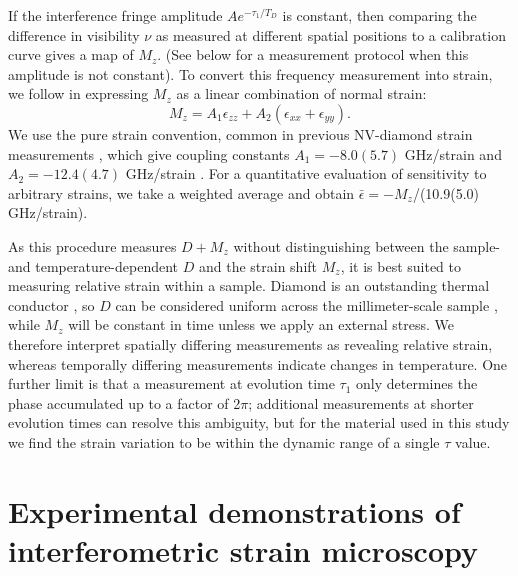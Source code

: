 \documentclass[reprint,superscriptaddress,hyphens,amsmath,amssymb,aps,prx,float]{revtex4-2}
\begin{document}
If the interference fringe amplitude $A e^{-\tau_1/T_D}$ is constant, then comparing the difference in visibility $\nu$ as measured at different spatial positions to a calibration curve gives a map of $M_z$.  (See below for a measurement protocol when this amplitude is not constant).  To convert this frequency measurement into strain, we follow \cite{BarfussHybridSystems2019} in expressing $M_z$ as a linear combination of normal strain:
\begin{equation}
    M_z=A_1 \epsilon_{zz}+A_2(\epsilon_{xx}+\epsilon_{yy}).
\end{equation}
We use the pure strain convention, common in previous NV-diamond strain measurements \cite{AusStrain2019,UdvarhelyiSpinStrain2018}, which give coupling constants $A_1=-8.0(5.7)$ GHz/strain and $A_2=-12.4(4.7)$ GHz/strain \cite{BarfussHybridSystems2019}.  For a quantitative evaluation of sensitivity to arbitrary strains, we take a weighted average and obtain $\bar{\epsilon}=-M_z$/(10.9(5.0) GHz/strain).  

As this procedure measures $D+M_z$ without distinguishing between the sample- and temperature-dependent $D$ and the strain shift $M_z$, it is best suited to measuring relative strain within a sample.  Diamond is an outstanding thermal conductor \cite{TwitchenThermalCond2001}, so $D$ can be considered uniform across the millimeter-scale sample \cite{WangThermometry2015}, while $M_z$ will be constant in time unless we apply an external stress.  We therefore interpret spatially differing measurements as revealing relative strain, whereas temporally differing measurements indicate changes in temperature.  One further limit is that a measurement at evolution time $\tau_1$ only determines the phase accumulated up to a factor of 2$\pi$; additional measurements at shorter evolution times can resolve this ambiguity, but for the material used in this study we find the strain variation to be within the dynamic range of a single $\tau$ value.

\section{Experimental demonstrations of interferometric strain microscopy}

\confocalfig
\end{document}
